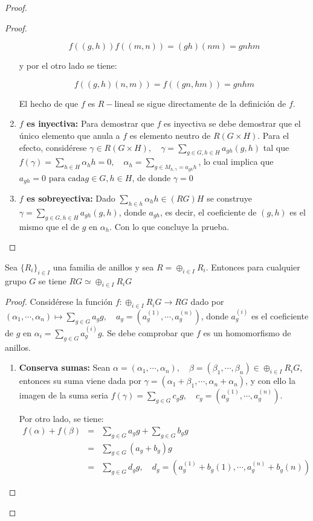\begin{proof}
\begin{proof}
\begin{enumerate}
\[ f((g,h))f((m,n)) = (gh)(nm) = gnhm  \]

y por el otro lado se tiene:

\[  f((g,h)(n,m)) = f((gn,hm)) = gnhm  \]

El hecho de que $f$ es $R-\mbox{lineal}$ se sigue directamente de la definición de $f$.

\item \textbf{$f$ es inyectiva:} Para demostrar que $f$ es inyectiva se debe demostrar que el único elemento que anula a $f$ es elemento neutro de $R(G\times H)$. Para el efecto, considérese $\gamma \in R(G\times H), \quad \gamma = \sum_{g \in G, h\in H}a_{gh}(g,h) $ tal que $f(\gamma) = \sum_{h \in H}\alpha_hh = 0 , \quad \alpha_h = \sum_{g \in M_{h,\gamma} = a_{gh}h}$, lo cual implica que $a_{gh} = 0 \mbox{ para cada} g \in G, h\in H$, de donde $\gamma = 0$

\item \textbf{$f$ es sobreyectiva:} Dado $\sum_{h \in h}\alpha_hh \in (RG)H$ se construye $\gamma = \sum_{g \in G, h\in H}a_{gh}(g,h)$, donde $a_{gh}$, es decir, el coeficiente de $(g,h)$ es el mismo que el de $g$ en $\alpha_h$. Con lo que concluye la prueba. 
\qedhere
\end{enumerate}
\end{proof}

\begin{lema}\label{lema2}
Sea $\{R_i\}_{i\in I}$ una familia de anillos y sea $R = \oplus_{i \in I}R_i$. Entonces para cualquier grupo $G$ se tiene $RG \simeq \oplus_{i \in I}R_iG$
\end{lema}

\begin{proof}
Considérese la función $f \colon \oplus_{i \in I}R_iG \to RG$ dado por $(\alpha_1, \cdots, \alpha_n) \mapsto \sum_{g \in G}a_gg, \quad a_g = (a_g^{(1)}, \cdots, a_g ^{(n)})$, donde $a_g^{(i)}$ es el coeficiente de $g$ en $\alpha_i = \sum_{g \in G}a_g^{(i)}g$. Se debe comprobar que $f$ es un homomorfismo de anillos.
\begin{enumerate}
\item \textbf{Conserva sumas:} Sean $\alpha = (\alpha_1, \cdots, \alpha_n), \quad \beta = (\beta_1, \cdots, \beta_n) \in \oplus_{i \in I}R_iG$, entonces su suma viene dada por $\gamma = (\alpha_1 + \beta_1, \cdots, \alpha_n + \alpha_n)$, y con ello la imagen de la suma seria $f(\gamma) = \sum_{g \in G}c_gg, \quad c_g = (a_g^{(1)}, \cdots, a_g^{(n)})$. 

Por otro lado, se tiene:
\begin{eqnarray*}
f(\alpha) + f(\beta) &=& \sum_{g \in G}a_gg + \sum_{g\in G}b_gg\\
 &=& \sum_{g \in G}(a_g + b_g)g \\
  & = &  \sum_{g \in G}d_gg, \quad d_g = (a_g^{(1)} + b_g{(1)}, \cdots, a_g^{(n)} + b_g{(n)} )
\end{eqnarray*}


\end{enumerate}
\end{proof}
\end{proof}
